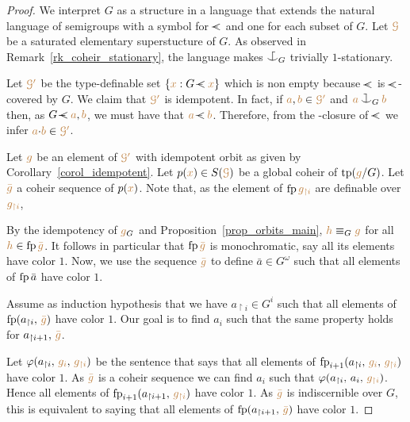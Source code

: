 \documentclass[creche.tex]{subfiles}
\begin{document}
\begin{proof}
We interpret $G$ as a structure in a language 
that extends the natural language of semigroups
with a symbol for $\rela$ and one for each subset of $G$.
Let ${\color{brown}\EuScript G}$ be a saturated elementary superstucture of $G$.
As observed in Remark~\ref{rk_coheir_stationary}, 
the language makes $\nonforkc_G$ trivially $1$-stationary.

Let ${\color{brown}\EuScript G'}$ be the type-definable set $\{{\mr x} : G\rela{\mr x}\}$ 
which is non empty because $\rela$ is $\rela$-covered by $G$. 
We claim that ${\color{brown}\EuScript G'}$ is idempotent. 
In fact, if ${\color{brown} a},{\color{brown} b}\in{\color{brown}\EuScript G'}$ and ${\mr a}\cnonfork_G{\mr b}$ 
then, as $G\rela{\mr a},{\mr b}$, we must have that ${\mr a}\rela{\mr b}$. 
Therefore, from the \reladot-closure of $\rela$ we infer ${\color{brown} a}{\cdot}{\color{brown} b}\in{\color{brown}\EuScript G'}$.

Let ${\color{brown} g}$ be an element of ${\color{brown}\EuScript G'}$ with idempotent orbit as given by Corollary~\ref{corol_idempotent}.
Let $p({\color{brown} x})\in S({\color{brown}\EuScript G})$ be a global coheir of ${\rm tp}({\color{brown} g}/G)$.
Let ${\color{brown}\bar g}$ a coheir sequence of $p({\color{brown} x})$. Note that, as the element of ${\rm fp}\,{\color{brown} g_{\restriction i} }$ are definable over ${\color{brown} g_{\restriction i}}$,


By the idempotency of ${\color{brown} g}_G$ and Proposition~\ref{prop_orbits_main}, 
${\color{brown} h}\equiv_G{\color{brown} g}$ for all ${\color{brown} h}\in {\rm fp}\,{\color{brown}\bar g}$.
It follows in particular that ${\rm fp}\,{\color{brown}\bar g}$ is monochromatic, say all its elements have color $1$.
Now, we use the sequence ${\color{brown}\bar g}$ to define $\bar a\in G^\omega$
such that all elements of ${\rm fp}\,\bar a$ have color $1$.

Assume as induction hypothesis that we have $a_{\restriction i}\in G^i$ 
such that all elements of ${\rm fp}(a_{\restriction i},\,{\color{brown}\bar g})$ have color $1$.
Our goal is to find $a_i$ 
such that the same property holds for $a_{\restriction i+1},\,{\color{brown}\bar g}$.

Let $\varphi(a_{\restriction i},\,{\color{brown} g_i},\,{\color{brown} g_{\restriction i}})$ 
be the sentence that says that all elements of 
${\rm fp}_{i+1}(a_{\restriction i},\,{\color{brown} g_i},\,{\color{brown} g_{\restriction i}})$ have color $1$.
As ${\color{brown}\bar g}$ is a coheir sequence we can find  $a_i$ 
such that $\varphi(a_{\restriction i},\,a_i,\,{\color{brown} g_{\restriction i}})$.
Hence all elements of ${\rm fp}_{i+1}(a_{\restriction i+1},\,{\color{brown} g_{\restriction i}})$ have color $1$.
As ${\color{brown}\bar g}$ is indiscernible over $G$, 
this is equivalent to saying that all elements of ${\rm fp}(a_{\restriction i+1},\,{\color{brown}\bar g})$ have color $1$.
\end{proof}
\end{document}
